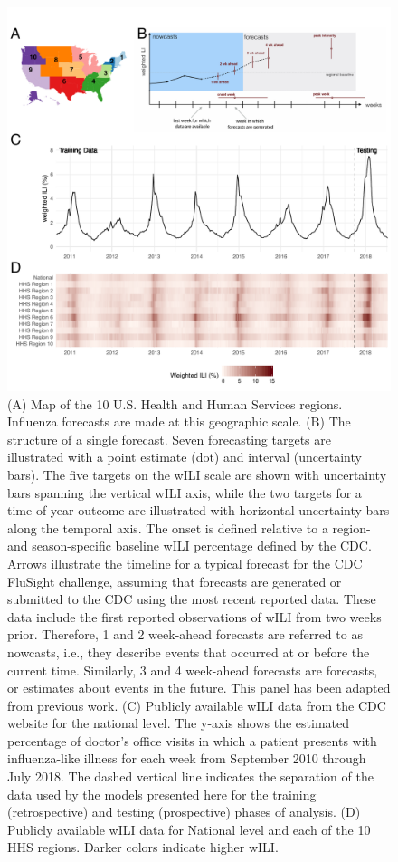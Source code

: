 \documentclass{article}\usepackage[]{graphicx}\usepackage[]{color}
\begin{document}
\begin{figure}[htbp]
\begin{center}
\includegraphics[width=\textwidth]{static-content/overview-figure-edited.pdf}
\caption{(A) Map of the 10 U.S. Health and Human Services regions. Influenza forecasts are made at this geographic scale. (B) The structure of a single forecast. Seven forecasting targets are illustrated with a point estimate (dot) and interval (uncertainty bars). The five targets on the wILI scale are shown with uncertainty bars spanning the vertical wILI axis, while the two targets for a time-of-year outcome are illustrated with horizontal uncertainty bars along the temporal axis. The onset is defined relative to a region- and season-specific baseline wILI percentage defined by the CDC.\cite{biggerstaff2018systematic} Arrows illustrate the timeline for a typical forecast for the CDC FluSight challenge, assuming that forecasts are generated or submitted to the CDC using the most recent reported data. These data include the first reported observations of wILI from two weeks prior. Therefore, 1 and 2 week-ahead forecasts are referred to as nowcasts, i.e., they describe events that occurred at or before the current time. Similarly, 3 and 4 week-ahead forecasts are forecasts, or estimates about events in the future. This panel has been adapted from previous work.\cite{Reich2018} (C) Publicly available wILI data from the CDC website for the national level. The y-axis shows the estimated percentage of doctor's office visits in which a patient presents with influenza-like illness for each week from September 2010 through July 2018. The dashed vertical line indicates the separation of the data used by the models presented here for the training (retrospective) and testing (prospective) phases of analysis. (D) Publicly available wILI data for National level and each of the 10 HHS regions. Darker colors indicate higher wILI.}
\label{fig:overview-schematic}
\end{center}
\end{figure}
\end{document}
